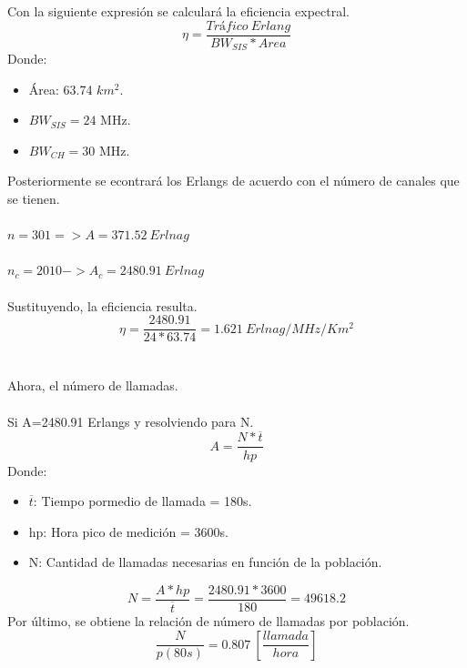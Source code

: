 \documentclass[11pt,letterpaper]{article}
\begin{document}
Con la siguiente expresión se calculará la eficiencia expectral.
\begin{equation}
    \eta=\frac{Tráfico \ Erlang}{BW_{SIS}*Area}
\end{equation}
Donde:
\begin{itemize}
    \item Área: 63.74 $km^2$.
    \item $BW_{SIS}=24$ MHz.
    \item $BW_{CH}=30$ MHz.
\end{itemize}

Posteriormente se econtrará los Erlangs de acuerdo con el número de canales que se tienen.
\\ \\
$n=301 => A=371.52 \ Erlnag$
\\ \\
$n_c=2010->A_c=2480.91 \ Erlnag$
\\ \\
Sustituyendo, la eficiencia resulta.
\begin{equation}
    \eta=\frac{2480.91}{24*63.74}=1.621 \ Erlnag/MHz/Km^2
\end{equation}
\\ \\
Ahora, el número de llamadas.
\\ \\
Si A=2480.91 Erlangs y resolviendo para N.
\begin{equation}
    A=\frac{N*\overline{t}}{hp}
\end{equation}
Donde:
\begin{itemize}
    \item $\overline{t}$: Tiempo pormedio de llamada = 180s.
    \item hp: Hora pico de medición = 3600s.
    \item N: Cantidad de llamadas necesarias en función de la población.
\end{itemize}
\begin{equation}
    N=\frac{A*hp}{\overline{t}}=\frac{2480.91*3600}{180}=49618.2
\end{equation}
Por último, se obtiene la relación de número de llamadas por población.
\begin{equation}
    \frac{N}{p(80s)}=0.807 \ [\frac{llamada}{hora}]
\end{equation}
\end{document}
